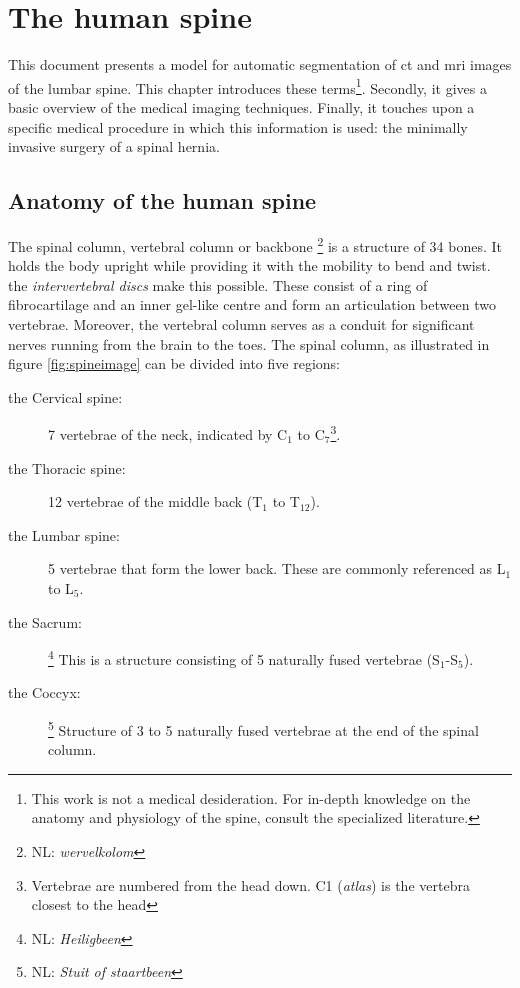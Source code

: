 \chapter{The human spine}\thispagestyle{empty}
\par{
    This document presents a model for automatic segmentation of \acrfull{ct} and \acrfull{mri} images of the lumbar spine.
    This chapter introduces these terms\footnote{This work is not a medical desideration. For in-depth knowledge on the anatomy and physiology of the spine, consult the specialized literature.}.
    Secondly, it gives a basic overview of the medical imaging techniques. 
    Finally, it touches upon a specific medical procedure in which this information is used: the minimally invasive surgery of a spinal hernia.
}
\section{Anatomy of the human spine}

\par{
    The spinal column, vertebral column or backbone \footnote{NL: \textit{wervelkolom}} is a structure of 34 bones. 
    It holds the body upright while providing it with the mobility to bend and twist.
    the \textit{intervertebral discs} make this possible. These consist of a ring of fibrocartilage and an inner gel-like centre and form an articulation between two vertebrae.
    Moreover, the vertebral column serves as a conduit for significant nerves running from the brain to the toes.
    The spinal column, as illustrated in figure \ref{fig:spineimage} can be divided into five regions:
}
\begin{description}
    \item[the Cervical spine:] 7 vertebrae of the neck, indicated by C$_1$ to C$_7$\footnote{Vertebrae are numbered from the head down. C1 (\textit{atlas}) is the vertebra closest to the head}.
    \item[the Thoracic spine:] 12 vertebrae of the middle back (T$_1$ to T$_{12}$).
    \item[the Lumbar spine:] 5 vertebrae that form the lower back. These are commonly referenced as L$_1$ to L$_5$.
    \item[the Sacrum:]\footnote{NL: \textit{Heiligbeen}} This is a structure consisting of 5 naturally fused vertebrae (S$_1$-S$_5$).
    \item[the Coccyx:]\footnote{NL: \textit{Stuit of staartbeen}} Structure of 3 to 5 naturally fused vertebrae at the end of the spinal column.
\end{description}


